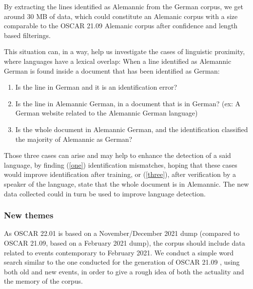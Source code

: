 By extracting the lines identified as Alemannic from the German corpus, we get around 30 MB of data, which could constitute an Alemanic corpus with a size comparable to the OSCAR 21.09 Alemanic corpus after confidence and length based filterings.


This situation can, in a way, help us investigate the cases of linguistic proximity, where languages have a lexical overlap: When a line identified as Alemannic German is found inside a document that has been identified as German:
\begin{enumerate}
    \item \label{one} Is the line in German and it is an identification error?
    \item Is the line in Alemannic German, in a document that is in German? (ex: A German website related to the Alemannic German language)
    \item \label{three} Is the whole document in Alemannic German, and the identification classified the majority of Alemannic as German?
\end{enumerate}

Those three cases can arise and may help to enhance the detection of a said language, by finding (\ref{one}) identification mismatches, hoping that these cases would improve identification after training, or (\ref{three}), after verification by a speaker of the language, state that the whole document is in Alemannic. The new data collected could in turn be used to improve language detection.


\subsubsection{New themes}

As OSCAR 22.01 is based on a November/December 2021 dump (compared to OSCAR 21.09, based on a February 2021 dump), the corpus should include data related to events contemporary to February 2021. We conduct a simple word search similar to the one conducted for the generation of OSCAR 21.09 \cite{abadji-etal-2021-ungoliant}, using both old and new events, in order to give a rough idea of both the actuality and the memory of the corpus.

